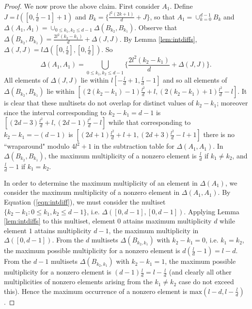 \documentclass[10pt,a4paper]{amsart}
\begin{document}
\begin{proof}
We now prove the above claim. First consider $A_1$.  Define $J=l([0,\frac{l}{d}-1]+1)$ and $B_k=\{\frac{l^2(2k+1)}{d}+J\}$, so that $A_1=\cup_{k=0}^{d-1} B_k$ and $\Delta(A_1,A_1)=\cup_{0 \leq k_1,k_2 \leq d-1} \Delta(B_{k_2},B_{k_1})$. Observe that $\Delta(B_{k_2},B_{k_1})=\frac{2l^2(k_2-k_1)}{d}+\Delta(J,J)$.  By Lemma \ref{lem:intdiffs}, $\Delta(J,J)=l \Delta([0,\frac{l}{d}], [0,\frac{l}{d}])$. So
\begin{equation}\label{eqn:intdiff}
\Delta(A_1,A_1)=\bigcup_{0 \leq k_1,k_2 \leq d-1}\{\frac{2l^2(k_2-k_1)}{d}+\Delta(J,J)\}.
\end{equation}
All elements of $\Delta(J,J)$ lie within $l[-\frac{l}{d}+1,\frac{l}{d}-1]$ and so all elements of $\Delta(B_{k_2},B_{k_1})$ lie within $[(2(k_2-k_1)-1)\frac{l^2}{d}+l, (2(k_2-k_1)+1)\frac{l^2}{d}-l]$.  It is clear that these multisets do not overlap for distinct values of $k_2-k_1$; moreover since the interval corresponding to $k_2-k_1=d-1$ is $[(2d-3)\frac{l^2}{d}+l,(2d-1)\frac{l^2}{d}-l]$ while that corresponding to $k_2-k_1=-(d-1)$ is $[(2d+1)\frac{l^2}{d}+l+1,(2d+3)\frac{l^2}{d}-l+1]$ there is no ``wraparound" modulo $4l^2+1$ in the subtraction table for $\Delta(A_1,A_1)$. In $\Delta(B_{k_2},B_{k_1})$, the maximum multiplicity of a nonzero element is $\frac{l}{d}$ if $k_1 \neq k_2$, and $\frac{l}{d}-1$ if $k_1=k_2$.

In order to determine the maximum multiplicity of an element in $\Delta(A_1)$, we consider the maximum multiplicity of a nonzero element in $\Delta(A_1,A_1)$.  By Equation (\ref{eqn:intdiff}), we must consider the multiset $\{k_2-k_1: 0 \leq k_1,k_2 \leq d-1\}$, i.e. $\Delta([0,d-1],[0,d-1])$. Applying Lemma \ref{lem:intdiffs} to this multiset, element $0$ attains maximum multiplicity $d$ while element $1$ attains multiplicity $d-1$, the maximum multiplicity in $\Delta([0,d-1])$.  From the $d$ multisets $\Delta(B_{k_2,k_1})$ with $k_2-k_1=0$, i.e. $k_1=k_2$, the maximum possible multiplicity for a nonzero element is $d (\frac{l}{d}-1)=l-d$. From the $d-1$ multisets $\Delta(B_{k_2,k_1})$ with $k_2-k_1=1$, the maximum possible multiplicity for a nonzero element is $(d-1)\frac{l}{d}=l-\frac{l}{d}$ (and clearly all other multiplicities of nonzero elements arising from the $k_1 \neq k_2$ case do not exceed this). Hence the maximum occurrence of a nonzero element is $\mathrm{max}(l-d,l-\frac{l}{d})$.
\end{proof}
\end{document}
